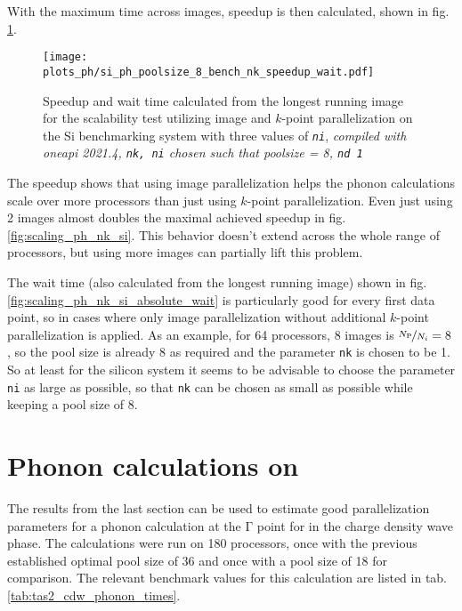 \documentclass[main.tex]{subfiles}
\begin{document}
With the maximum time across images, speedup is then calculated, shown in fig. \ref{fig:scaling_ph_ni_poolsize_8_si}.

\begin{figure}[htb!]
    \centering
    \texttt{[image: plots\_ph/si\_ph\_poolsize\_8\_bench\_nk\_speedup\_wait.pdf]}
    \caption{Speedup and wait time calculated from the longest running image for the scalability test utilizing image and \(k\)-point parallelization on the Si benchmarking system with three values of \emph{\texttt{ni}}, \emph{\QE compiled with \gls{oneapi} 2021.4, \texttt{nk, ni} chosen such that poolsize = 8, \texttt{nd 1}}}
    \label{fig:scaling_ph_ni_poolsize_8_si}
\end{figure}
The speedup shows that using image parallelization helps the phonon calculations scale over more processors than just using \(k\)-point parallelization.
Even just using 2 images almost doubles the maximal achieved speedup in fig. \ref{fig:scaling_ph_nk_si}.
This behavior doesn't extend across the whole range of processors, but using more images can partially lift this problem.

The wait time (also calculated from the longest running image) shown in fig. \ref{fig:scaling_ph_nk_si_absolute_wait} is particularly good for every first data point, so in cases where only image parallelization without additional \(k\)-point parallelization is applied.
As an example, for 64 processors, 8 images is \(\nicefrac{N_\mathrm{P}}{N_i} = 8\), so the pool size is already 8 as required and the parameter \texttt{nk} is chosen to be 1.
So at least for the silicon system it seems to be advisable to choose the parameter \texttt{ni} as large as possible, so that \texttt{nk} can be chosen as small as possible while keeping a pool size of 8.

\section{Phonon calculations on \TaS}\label{sec:phonon_tas2}

The results from the last section can be used to estimate good parallelization parameters for a phonon calculation at the \(\mathrm{\Gamma}\) point for \TaS in the charge density wave phase.
The calculations were run on 180 processors, once with the previous established optimal pool size of 36 and once with a pool size of 18 for comparison.
The relevant benchmark values for this calculation are listed in tab. \ref{tab:tas2_cdw_phonon_times}.
\end{document}
